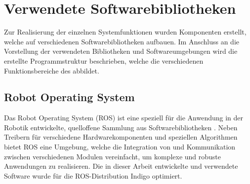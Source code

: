 
\prever{
}

\section{Verwendete Softwarebibliotheken}
Zur Realisierung der einzelnen Systemfunktionen wurden Komponenten erstellt, welche auf verschiedenen Softwarebibliotheken aufbauen.
Im Anschluss an die Vorstellung der verwendeten Bibliotheken und Softwareumgebungen wird die erstellte Programmstruktur beschrieben, welche die verschiedenen Funktionsbereiche des  abbildet.

\subsection{Robot Operating System}
\label{chap:ros}
Das Robot Operating System (ROS) ist eine speziell für die Anwendung in der Robotik entwickelte, quelloffene Sammlung aus Softwarebibliotheken \cite{ROS}. Neben Treibern für verschiedene Hardwarekomponenten und speziellen Algorithmen bietet ROS eine Umgebung, welche die Integration von und Kommunikation zwischen verschiedenen Modulen vereinfacht, um komplexe und robuste Anwendungen zu realisieren. Die in dieser Arbeit entwickelte und verwendete Software wurde für die ROS-Distribution Indigo optimiert.

